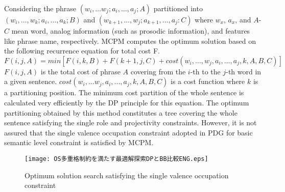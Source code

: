 Considering the phrase $(w_i,…w_j; a_i,…,a_j; A)$ partitioned into $(w_i,…,w_k;
a_i,…,a_k; B)$ and $(w_{k+1},…,w_j; a_{k+1},…, a_j: C)$ where
$w_x$, $a_x$, and $A$-$C$ mean word, analog information (such as prosodic
information), and features like phrase name, respectively. MCPM computes
the optimum solution based on the following recurrence equation for
total cost F.
\[
 F(i,j,A) = min[F(i,k,B)+F(k+1,j,C)+cost(w_i,…,w_j, a_i,…,a_j,k,A,B,C)]
\]
$F(i,j,A)$ is the total cost of phrase $A$ covering from
the $i$-th to the $j$-th word in a given sentence. $cost(w_i,...w_j,
a_i,...,a_j,k,A,B,C)$ is a cost function where $k$ is a partitioning
position. The minimum cost partition of the whole sentence is
calculated very efficiently by the DP principle for this equation. The
optimum partitioning obtained by this method constitutes a tree
covering the whole sentence satisfying the single role and
projectivity constraints. However, it is not assured that the single
valence occupation constraint adopted in PDG for basic semantic level
constraint is satisfied by MCPM.

\begin{figure}[bt]
\myfiglabelskippre
 \begin{center}
     \texttt{[image: OS多重格制約を満たす最適解探索DPとBB比較ENG.eps]}
 \end{center}
\myfiglabelskippre
\caption{Optimum solution search satisfying the single valence occupation constraint}
\label{fig:SingleValenceOccupationProblem}
\myfiglabelskippre
\end{figure}

